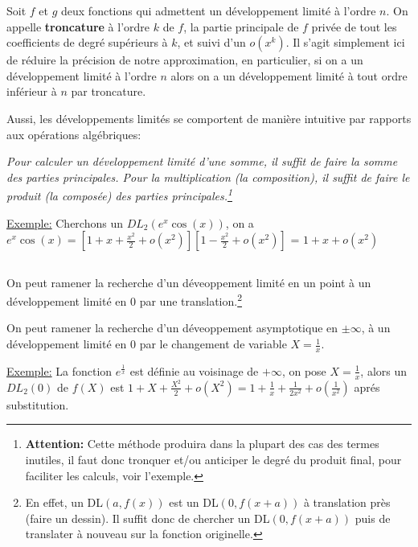 Soit \(f\) et \(g\) deux fonctions qui admettent un développement limité à l'ordre \(n\).\+
On appelle \textbf{troncature} à l'ordre \(k\) de \(f\), la partie principale de \(f\) privée de tout les coefficients de degré supérieurs à \(k\), et suivi d'un \(o(x^k)\). Il s'agit simplement ici de réduire la précision de notre approximation, en particulier, si on a un développement limité à l'ordre \(n\) alors on a un développement limité à tout ordre inférieur à \(n\) par troncature.\<

Aussi, les développements limités se comportent de manière intuitive par rapports aux opérations algébriques:
\begin{center}
   \textit{Pour calculer un développement limité d'une somme, il suffit de faire la somme des parties principales. \+
   Pour la multiplication (la composition), il suffit de faire le produit (la composée) des parties principales.\footnote[1]{\textbf{Attention:} Cette méthode produira dans la plupart des cas des termes inutiles, il faut donc tronquer et/ou anticiper le degré du produit final, pour faciliter les calculs, voir l'exemple.} }
\end{center}

\underline{Exemple:} Cherchons un \(DL_2(e^x\cos(x))\), on a \(e^x\cos(x) = [1 + x + \frac{x^2}{2}+o(x^2)] [1 - \frac{x^2}{2} + o(x^2)]  \) = \(1 + x + o(x^2)\)

\subsection*{}

On peut ramener la recherche d'un déveoppement limité en un point à un développement limité en \(0\) par une translation.\footnote[1]{En effet, un DL\((a, f(x))\) est un DL\((0, f(x + a))\) à translation près (faire un dessin). Il suffit donc de chercher un DL\((0, f(x + a))\) puis de translater à nouveau sur la fonction originelle.}\<

On peut ramener la recherche d'un déveoppement asymptotique en \(\pm \infty\), à un développement limité en \(0\) par le changement de variable
\( X = \frac{1}{x}\).\<

\underline{Exemple:} La fonction \(e^\frac{1}{x}\) est définie au voisinage de \(+ \infty\), on pose \(X = \frac{1}{x}\), alors un \(DL_2(0)\) de \(f(X)\) est \(1 + X + \frac{X^2}{2}+o(X^2) = 1 + \frac{1}{x} + \frac{1}{2x^2} + o(\frac{1}{x^2})\) aprés substitution.
\pagebreak

